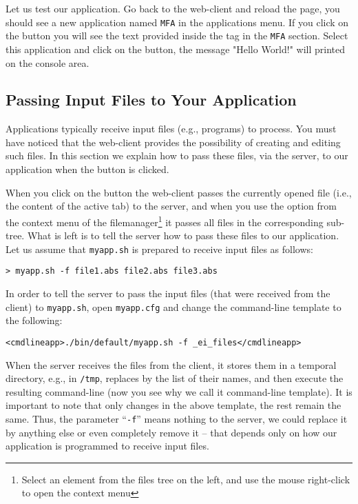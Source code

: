 Let us test our application. Go back to the web-client and reload the
page, you should see a new application named \texttt{MFA} in the
applications menu. If you click on the \helpbutton button you will see
the text provided inside the  tag in the \texttt{MFA}
section.
%
Select this application and click on the \applybutton button, the
message "Hello World!" will printed on the console area.


\subsection{Passing Input Files to Your Application}

Applications typically receive input files (e.g., programs) to
process. You must have noticed that the web-client provides the
possibility of creating and editing such files.  In this section we
explain how to pass these files, via the server, to our application
when the \applybutton button is clicked.

When you click on the \applybutton button the web-client passes the
currently opened file (i.e., the content of the active tab) to the
server, and when you use the \applybutton option from the context menu
of the filemanager\footnote{Select an element from the files tree on
  the left, and use the mouse right-click to open the context menu} it
passes all files in the corresponding sub-tree.
%
What is left is to tell the server how to pass these files to our
application. Let us assume that \texttt{myapp.sh} is prepared to
receive input files as follows:

\medskip
\begin{lstlisting}
> myapp.sh -f file1.abs file2.abs file3.abs
\end{lstlisting}

\medskip 
\noindent
In order to tell the server to pass the input files (that were
received from the client) to \texttt{myapp.sh}, open
\texttt{myapp.cfg} and change the command-line template to the
following:

\medskip
\begin{lstlisting}
<cmdlineapp>./bin/default/myapp.sh -f _ei_files</cmdlineapp>
\end{lstlisting}

\medskip
\noindent
When the server receives the files from the client, it stores them in
a temporal directory, e.g., in \texttt{/tmp}, replaces 
by the list of their names, and then execute the resulting
command-line (now you see why we call it command-line template).
%
It is important to note that only  changes in the above
template, the rest remain the same. Thus, the parameter
``\texttt{-f}'' means nothing to the server, we could replace it by
anything else or even completely remove it -- that depends only on how
our application is programmed to receive input files.

